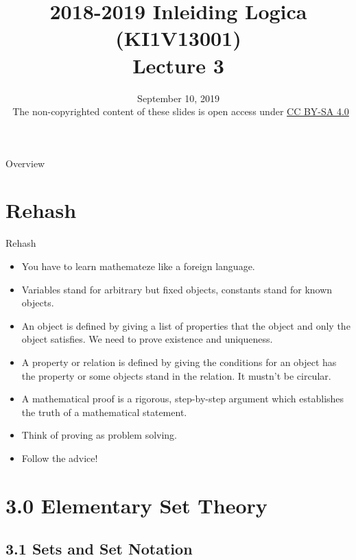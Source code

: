 \documentclass[../slides.tex]{subfiles}
\title{2018-2019 Inleiding Logica (KI1V13001) \\ Lecture 3}
\date{September 10, 2019\\[2ex] {\tiny \textcopyright~The non-copyrighted content of these slides is open access under \href{https://creativecommons.org/licenses/by-sa/4.0/}{CC BY-SA 4.0}}}
\begin{document}
\setcounter{framenumber}{63}
\begin{frame}
	\maketitle
\end{frame}

\begin{frame}{Overview}
\tableofcontents
\end{frame}

\section{Rehash}
\begin{frame}{Rehash}

\begin{itemize}

	\item You have to learn mathemateze like a foreign language.
	
	\item Variables stand for arbitrary but fixed objects, constants stand for known objects. 

	\item \alert{An object is defined by giving a list of properties that the object and only the object satisfies. We need to prove existence and uniqueness.}	
				
		\item \alert{A property or relation is defined by giving the conditions for an object has the property or some objects stand in the relation. It mustn't be circular.}
		
		\item  \alert{A mathematical proof is a rigorous, step-by-step argument which establishes the truth of a mathematical statement.} 

		\item Think of proving as problem solving. 
		
		\item Follow the advice!


\end{itemize}

\end{frame}

\section{3.0 Elementary Set Theory}
\subsection{3.1 Sets and Set Notation}
\end{document}
